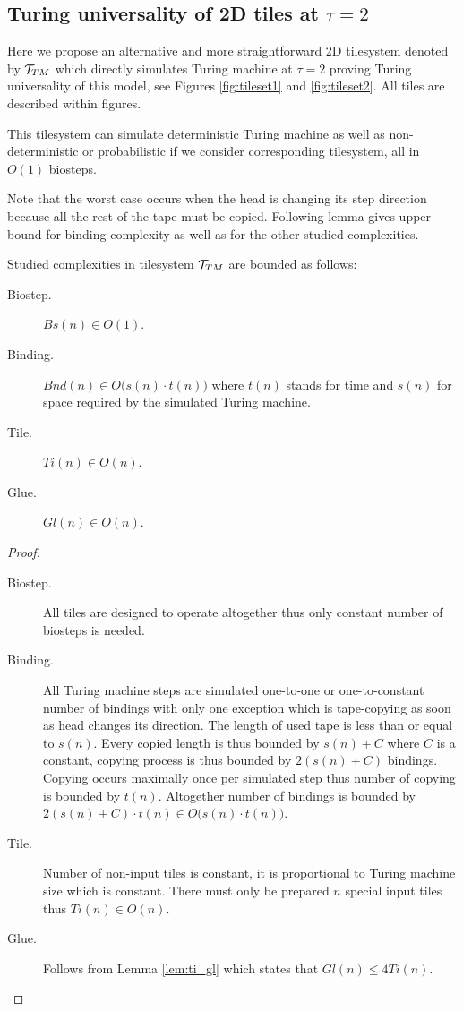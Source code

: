 \subsection{Turing universality of 2D tiles at $\tau=2$}
\label{sec:my_TU}
	
	Here we propose an alternative and more straightforward 2D tilesystem denoted by ${\cal T}_{TM}$ which directly simulates Turing machine at $\tau=2$ proving Turing universality of this model, see Figures \ref{fig:tileset1} and \ref{fig:tileset2}. All tiles are described within figures.
	\begin{remark}
		This tilesystem can simulate deterministic Turing machine as well as non-deter\-ministic or probabilistic if we consider corresponding tilesystem, all in $O(1)$ biosteps.
	\end{remark}
	Note that the worst case occurs when the head is changing its step direction because all the rest of the tape must be copied. Following lemma gives upper bound for binding complexity as well as for the other studied complexities.
	\begin{lemma}
	\label{lem:TM_bound}
		Studied complexities in tilesystem ${\cal T}_{TM}$ are bounded as follows:
		\begin{description}
			\item[Biostep.] $Bs(n) \in O(1)$.
			\item[Binding.] $Bnd(n) \in O\bigl(s(n)\cdot t(n)\bigr)$ where $t(n)$ stands for time and $s(n)$ for space required by the simulated Turing machine.
			\item[Tile.] $Ti(n) \in O(n)$.
			\item[Glue.] $Gl(n) \in O(n)$.
		\end{description}
	\end{lemma}
	\begin{proof}
		~
		\begin{description}
			\item[Biostep.] All tiles are designed to operate altogether thus only constant number of biosteps is needed.
			\item[Binding.] All Turing machine steps are simulated one-to-one or one-to-constant number of bindings with only one exception which is tape-copying as soon as head changes its direction. The length of %
			used tape is less than or equal to $s(n)$. Every copied length is thus bounded by $s(n) + C$ where $C$ is a constant, copying process is thus bounded by $2(s(n)+C)$ bindings. Copying occurs maximally once per simulated step thus number of copying is bounded by $t(n)$. Altogether number of bindings is bounded by $2(s(n)+C)\cdot t(n) \in O\bigl(s(n)\cdot t(n)\bigr)$.
			\item[Tile.] Number of non-input tiles is constant, it is proportional to Turing machine size which is constant. There must only be prepared $n$ special input tiles thus $Ti(n) \in O(n)$.
			\item[Glue.] Follows from Lemma \ref{lem:ti_gl} which states that $Gl(n) \leq 4Ti(n)$.
		\end{description}
	\end{proof}
